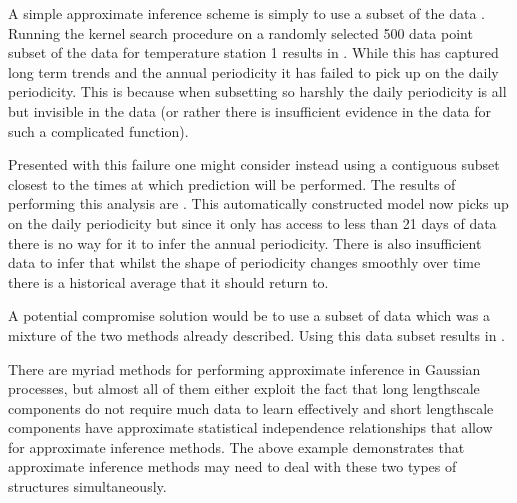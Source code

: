 A simple approximate inference scheme is simply to use a subset of the data \citep[e.g.][]{Quinonero-Candela2005-er}.
Running the kernel search procedure on a randomly selected 500 data point subset of the data for temperature station 1 results in .
While this has captured long term trends and the annual periodicity it has failed to pick up on the daily periodicity.
This is because when subsetting so harshly the daily periodicity is all but invisible in the data (or rather there is insufficient evidence in the data for such a complicated function).

Presented with this failure one might consider instead using a contiguous subset closest to the times at which prediction will be performed.
The results of performing this analysis are .
This automatically constructed model now picks up on the daily periodicity but since it only has access to less than 21 days of data there is no way for it to infer the annual periodicity.
There is also insufficient data to infer that whilst the shape of periodicity changes smoothly over time there is a historical average that it should return to.

A potential compromise solution would be to use a subset of data which was a mixture of the two methods already described.
Using this data subset results in .

There are myriad methods for performing approximate inference in Gaussian processes, but almost all of them either exploit the fact that long lengthscale components do not require much data to learn effectively and short lengthscale components have approximate statistical independence relationships that allow for approximate inference methods.
The above example demonstrates that approximate inference methods may need to deal with these two types of structures simultaneously.

